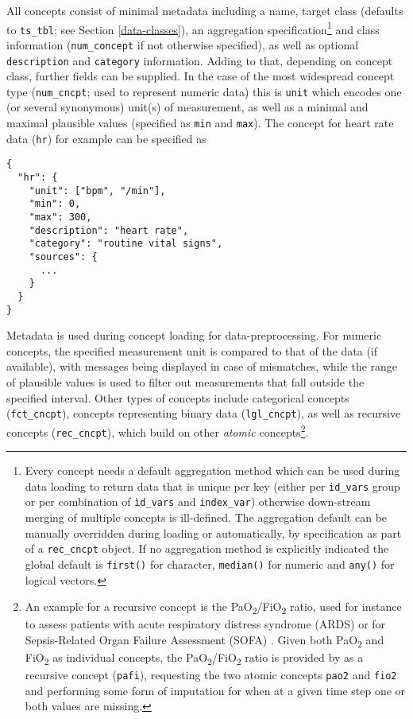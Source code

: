 \documentclass[
  notitle,
  nojss,
  noheadings]{jss}
\begin{document}
All concepts consist of minimal metadata including a name, target class
(defaults to \texttt{ts\_tbl}; see Section \ref{data-classes}), an
aggregation specification\footnote{Every concept needs a default
  aggregation method which can be used during data loading to return
  data that is unique per key (either per \texttt{id\_vars} group or per
  combination of \texttt{ìd\_vars} and \texttt{index\_var}) otherwise
  down-stream merging of multiple concepts is ill-defined. The
  aggregation default can be manually overridden during loading or
  automatically, by specification as part of a \texttt{rec\_cncpt}
  object. If no aggregation method is explicitly indicated the global
  default is \texttt{first()} for character, \texttt{median()} for
  numeric and \texttt{any()} for logical vectors.} and class information
(\texttt{num\_concept} if not otherwise specified), as well as optional
\texttt{description} and \texttt{category} information. Adding to that,
depending on concept class, further fields can be supplied. In the case
of the most widespread concept type (\texttt{num\_cncpt}; used to
represent numeric data) this is \texttt{unit} which encodes one (or
several synonymous) unit(s) of measurement, as well as a minimal and
maximal plausible values (specified as \texttt{min} and \texttt{max}).
The concept for heart rate data (\texttt{hr}) for example can be
specified as

\begin{verbatim}
{
  "hr": {
    "unit": ["bpm", "/min"],
    "min": 0,
    "max": 300,
    "description": "heart rate",
    "category": "routine vital signs",
    "sources": {
      ...
    }
  }
}
\end{verbatim}

Metadata is used during concept loading for data-preprocessing. For
numeric concepts, the specified measurement unit is compared to that of
the data (if available), with messages being displayed in case of
mismatches, while the range of plausible values is used to filter out
measurements that fall outside the specified interval. Other types of
concepts include categorical concepts (\texttt{fct\_cncpt}), concepts
representing binary data (\texttt{lgl\_cncpt}), as well as recursive
concepts (\texttt{rec\_cncpt}), which build on other \emph{atomic}
concepts\footnote{An example for a recursive concept is the
  PaO\textsubscript{2}/FiO\textsubscript{2} ratio, used for instance to
  assess patients with acute respiratory distress syndrome (ARDS) or for
  Sepsis-Related Organ Failure Assessment (SOFA)
  \citep{villar2013, vincent1996}. Given both PaO\textsubscript{2} and
  FiO\textsubscript{2} as individual concepts, the
  PaO\textsubscript{2}/FiO\textsubscript{2} ratio is provided by
   as a recursive concept (\texttt{pafi}), requesting the two
  atomic concepts \texttt{pao2} and \texttt{fio2} and performing some
  form of imputation for when at a given time step one or both values
  are missing.}.
\end{document}
